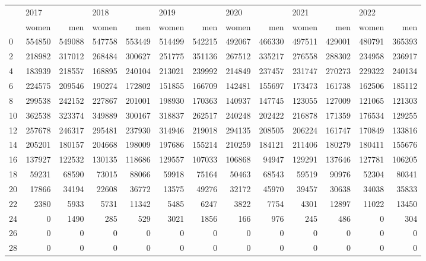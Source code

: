 \begin{tabular}{lrrrrrrrrrrrr}
\toprule
{} & \multicolumn{2}{l}{2017} & \multicolumn{2}{l}{2018} & \multicolumn{2}{l}{2019} & \multicolumn{2}{l}{2020} & \multicolumn{2}{l}{2021} & \multicolumn{2}{l}{2022} \\
{} &   women &     men &   women &     men &   women &     men &   women &     men &   women &     men &   women &     men \\
\midrule
0  &  554850 &  549088 &  547758 &  553449 &  514499 &  542215 &  492067 &  466330 &  497511 &  429001 &  480791 &  365393 \\
2  &  218982 &  317012 &  268484 &  300627 &  251775 &  351136 &  267512 &  335217 &  276558 &  288302 &  234958 &  236917 \\
4  &  183939 &  218557 &  168895 &  240104 &  213021 &  239992 &  214849 &  237457 &  231747 &  270273 &  229322 &  240134 \\
6  &  224575 &  209546 &  190274 &  172802 &  151855 &  166709 &  142481 &  155697 &  173473 &  161738 &  162506 &  185112 \\
8  &  299538 &  242152 &  227867 &  201001 &  198930 &  170363 &  140937 &  147745 &  123055 &  127009 &  121065 &  121303 \\
10 &  362538 &  323374 &  349889 &  300167 &  318837 &  262517 &  240248 &  202422 &  216878 &  171359 &  176534 &  129255 \\
12 &  257678 &  246317 &  295481 &  237930 &  314946 &  219018 &  294135 &  208505 &  206224 &  161747 &  170849 &  133816 \\
14 &  205201 &  180157 &  204668 &  198009 &  197686 &  155214 &  210259 &  184121 &  211406 &  180279 &  180411 &  155676 \\
16 &  137927 &  122532 &  130135 &  118686 &  129557 &  107033 &  106868 &   94947 &  129291 &  137646 &  127781 &  106205 \\
18 &   59231 &   68590 &   73015 &   88066 &   59918 &   75164 &   50463 &   68543 &   59519 &   90976 &   52304 &   80341 \\
20 &   17866 &   34194 &   22608 &   36772 &   13575 &   49276 &   32172 &   45970 &   39457 &   30638 &   34038 &   35833 \\
22 &    2380 &    5933 &    5731 &   11342 &    5485 &    6247 &    3822 &    7754 &    4301 &   12897 &   11022 &   13450 \\
24 &       0 &    1490 &     285 &     529 &    3021 &    1856 &     166 &     976 &     245 &     486 &       0 &     304 \\
26 &       0 &       0 &       0 &       0 &       0 &       0 &       0 &       0 &       0 &       0 &       0 &       0 \\
28 &       0 &       0 &       0 &       0 &       0 &       0 &       0 &       0 &       0 &       0 &       0 &       0 \\
\bottomrule
\end{tabular}
